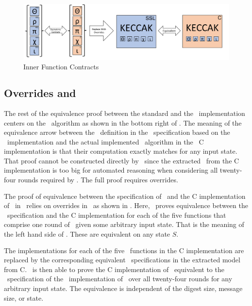 \begin{figure}[t]
  \centering
  \includegraphics[width=\linewidth]{figs/proof2.png}
  
  \caption{Inner Function Contracts}
  \label{fig:proofStructure2}
  
\end{figure}

\subsection{Overrides and \keccak}

The rest of the equivalence proof between the standard and the \openssl\ implementation centers on the \keccak\ algorithm as shown in the bottom right of .
The meaning of the equivalence arrow between the \keccak\ definition in the \cryptol\ specification based on the \openssl\ implementation and the actual implemented \keccak\ algorithm in the \openssl\ C implementation is that their computation exactly matches for any input state.
That proof cannot be constructed directly by \saw\ since the extracted \sawcore\ from the C implementation is too big for automated reasoning when considering all twenty-four rounds required by \keccak.
The full proof requires overrides.

The proof of equivalence between the specification of \keccak\ and the C implementation of \keccak\ in \openssl\ relies on overrides in \saw\ as shown in .
Here, \saw\ proves equivalence between the \cryptol\ specification and the C implementation for each of the five functions that comprise one round of \keccak\ given some arbitrary input state.
That is the meaning of the left hand side of .
These are equivalent on any state $S$.

The implementations for each of the five \keccak\ functions in the C implementation are replaced by the corresponding equivalent \cryptol\ specifications in the extracted model from C.
\saw\ is then able to prove the C implementation of \keccak\ equivalent to the \cryptol\ specification of the \openssl\ implementation of \keccak\ over all twenty-four rounds for any arbitrary input state.
The equivalence is independent of the digest size, message size, or state.


